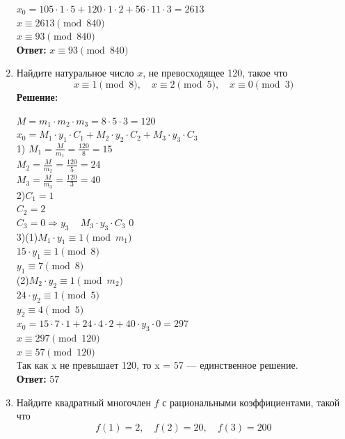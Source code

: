 \documentclass[]{book}
\theoremstyle{definition}
\begin{document}
\begin{enumerate}
$x_0 = 105\cdot 1\cdot 5 + 120\cdot 1\cdot 2 + 56\cdot 11\cdot 3 = 2613$ \\
$x \equiv 2613 \pmod {840}$\\
$x \equiv 93 \pmod {840}$\\
\textbf{Ответ: } $x \equiv 93 \pmod {840}$


\item Найдите натуральное число $x$, не превосходящее 120, такое что
$$x \equiv 1 \pmod{8}, \quad x \equiv 2 \pmod{5}, \quad x \equiv 0 \pmod{3} $$
\textbf{Решение:}

$M = m_1\cdot m_2\cdot m_3 = 8\cdot 5\cdot 3 = 120$\\
$x_0 = M_1\cdot y_1\cdot C_1 + M_2\cdot y_2\cdot C_2 + M_3\cdot y_3\cdot C_3$ \\

1) $M_1 = \frac{M}{m_1} = \frac{120}{8} = 15$\\
$M_2 = \frac{M}{m_2} = \frac{120}{5} = 24$\\
$M_3 = \frac{M}{m_3} = \frac{120}{3} = 40$\\

2)$ C_1 = 1$\\
$C_2 = 2$\\
$C_3 = 0 \Longrightarrow y_3$ \  $M_3\cdot y_3\cdot C_3$  $0$\\

3)(1)$M_1\cdot y_1\equiv 1 \pmod {m_1}$\\
$15\cdot y_1\equiv 1 \pmod {8}$\\
$y_1\equiv 7 \pmod {8}$\\
(2)$M_2\cdot y_2\equiv 1 \pmod {m_2}$\\
$24\cdot y_2\equiv 1 \pmod {5}$\\
$y_2\equiv 4 \pmod {5}$\\

$x_0 = 15\cdot 7\cdot 1 + 24\cdot 4\cdot 2 + 40\cdot y_3\cdot 0 = 297$ \\
$x \equiv 297 \pmod {120}$\\
$x \equiv 57 \pmod {120}$\\
Так как x не превышает 120, то x = 57 — единственное решение.\\
\textbf{Ответ: } $57$




\item Найдите квадратный многочлен $f$ с рациональными коэффициентами, такой что 
$$f(1) = 2, \quad f(2) = 20, \quad f(3) = 200$$


\end{enumerate}
\end{document}
